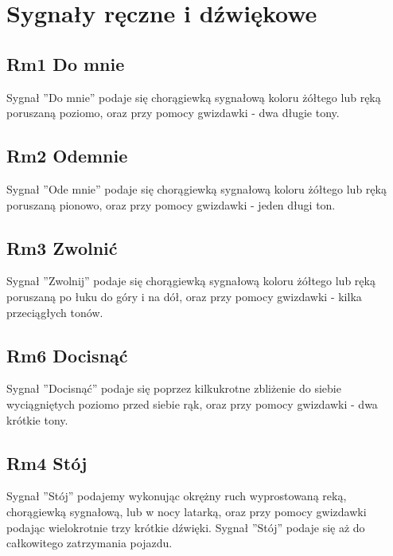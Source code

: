 \section{Sygnały ręczne i dźwiękowe}
\subsection{Rm1 Do mnie}
Sygnał ''Do mnie'' podaje się chorągiewką sygnałową koloru żółtego lub ręką poruszaną poziomo, oraz przy pomocy gwizdawki - dwa długie tony.

\subsection{Rm2 Odemnie}
Sygnał ''Ode mnie'' podaje się chorągiewką sygnałową koloru żółtego lub ręką poruszaną pionowo, oraz przy pomocy gwizdawki - jeden długi ton.
\subsection{Rm3 Zwolnić}
Sygnał ''Zwolnij'' podaje się chorągiewką sygnałową koloru żółtego lub ręką poruszaną po łuku do góry i na dół, oraz przy pomocy gwizdawki - kilka przeciągłych tonów.
\subsection{Rm6 Docisnąć}
Sygnał ''Docisnąć'' podaje się poprzez kilkukrotne zbliżenie do siebie wyciągniętych poziomo przed siebie rąk, oraz przy pomocy gwizdawki - dwa krótkie tony.
\subsection{Rm4 Stój}
Sygnał ''Stój'' podajemy wykonując okrężny ruch wyprostowaną reką, chorągiewką sygnałową, lub w nocy latarką, oraz przy pomocy gwizdawki podając wielokrotnie trzy krótkie dźwięki. Sygnał ''Stój'' podaje się aż do całkowitego zatrzymania pojazdu.

